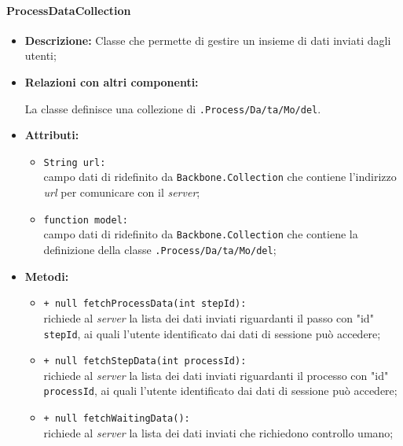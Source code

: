 \paragraph{ProcessDataCollection}
\label{processDataCollection}
\begin{flushleft}
\begin{itemize}
\item \textbf{Descrizione:} Classe che permette di gestire un insieme di dati inviati dagli utenti;
\item \textbf{Relazioni con altri componenti:}
\begin{sloppypar}
La classe definisce una collezione di \texttt{\model{}.Process\fshyp{}Da\fshyp{}ta\fshyp{}Mo\fshyp{}del}.
\end{sloppypar}
\item \textbf{Attributi:}
\begin{sloppypar}
\begin{itemize}
\item \texttt{String url:}\\ campo dati di ridefinito da \texttt{Backbone.Collection} che contiene l'indirizzo \textit{url} per comunicare con il \textit{server};
\item \texttt{function model:}\\ campo dati di ridefinito da \texttt{Backbone.Collection} che contiene la definizione della classe \texttt{\model{}.Process\fshyp{}Da\fshyp{}ta\fshyp{}Mo\fshyp{}del};
\end{itemize}
\end{sloppypar}
\item \textbf{Metodi:}
\begin{sloppypar}
\begin{itemize}
\item \texttt{+ null fetchProcessData(int stepId):}\\ richiede al \textit{server} la lista dei dati inviati riguardanti il passo con "id" \texttt{stepId}, ai quali l'utente identificato dai dati di sessione può accedere;
\item \texttt{+ null fetchStepData(int processId):}\\ richiede al \textit{server} la lista dei dati inviati riguardanti il processo con "id" \texttt{processId}, ai quali l'utente identificato dai dati di sessione può accedere;
\item \texttt{+ null fetchWaitingData():}\\ richiede al \textit{server} la lista dei dati inviati che richiedono controllo umano;

\end{itemize}
\end{sloppypar}
\end{itemize}
\end{flushleft}
